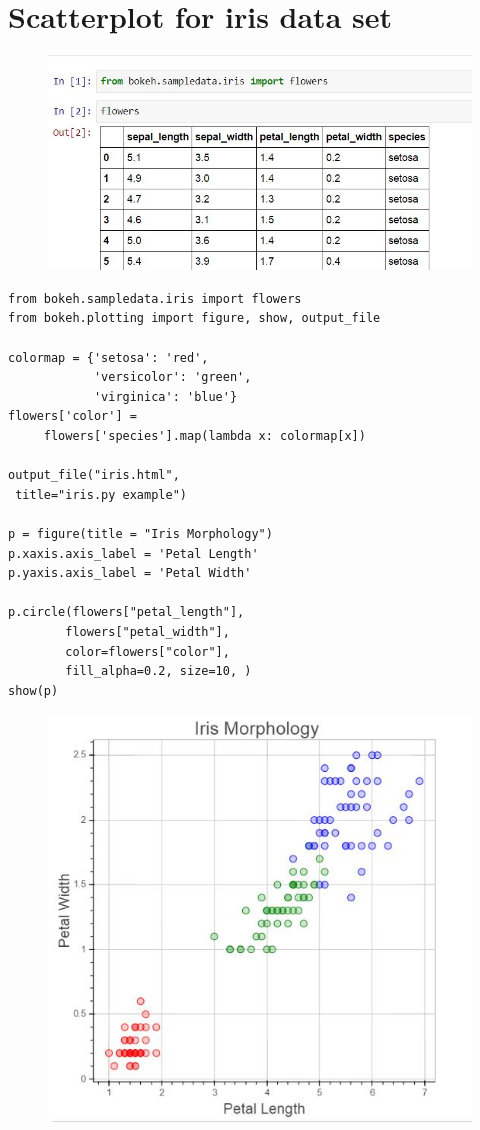 \documentclass[a4paper,12pt]{article}
\begin{document}
	\large
\section*{Scatterplot for iris data set}
\begin{figure}[h!]
	\centering
	\includegraphics[width=0.8\linewidth]{images/iris-head}
\end{figure}
\begin{framed}
\begin{verbatim}
from bokeh.sampledata.iris import flowers
from bokeh.plotting import figure, show, output_file

colormap = {'setosa': 'red', 
            'versicolor': 'green', 
            'virginica': 'blue'}
flowers['color'] = 
     flowers['species'].map(lambda x: colormap[x])

output_file("iris.html", 
 title="iris.py example")

p = figure(title = "Iris Morphology")
p.xaxis.axis_label = 'Petal Length'
p.yaxis.axis_label = 'Petal Width'

p.circle(flowers["petal_length"],
        flowers["petal_width"],
        color=flowers["color"], 
        fill_alpha=0.2, size=10, )
show(p)
\end{verbatim}
\end{framed}
\newpage
\begin{figure}[h!]
\centering
\includegraphics[width=0.6\linewidth]{images/02-iris-scatterplot1-petal}

\end{figure}
\end{document}
